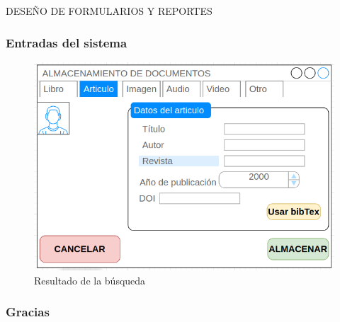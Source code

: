 \documentclass[article]{beamer}
\begin{document}
\begin{frame}{DESEÑO DE FORMULARIOS Y REPORTES}
\frametitle{Entradas del sistema}
\begin{figure}[ht]
	\centering
	\includegraphics[scale=0.4]{images/almacenamientoDato1}
	\caption{Resultado de la búsqueda}
\end{figure}
\end{frame}



\begin{frame}[fragile]
\frametitle{Gracias}
\begin{center}
\Huge{\color{blue}{Gracias!}}
\end{center}
\end{frame}
\end{document}
